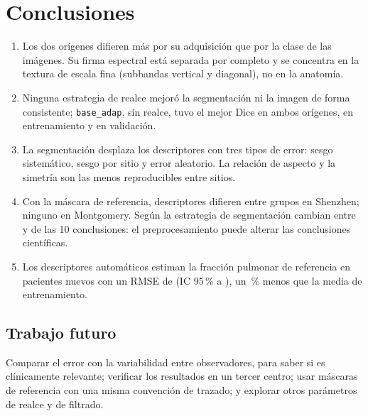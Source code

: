 ﻿\section{Conclusiones}

\begin{enumerate}
    \item Los dos orígenes difieren más por su adquisición que por la clase de las
    imágenes. Su firma espectral está separada por completo y se concentra en la
    textura de escala fina (subbandas vertical y diagonal), no en la anatomía.
    \item Ninguna estrategia de realce mejoró la segmentación ni la imagen de forma
    consistente; \texttt{base\_adap}, sin realce, tuvo el mejor Dice en ambos
    orígenes, en entrenamiento y en validación.
    \item La segmentación desplaza los descriptores con tres tipos de error: sesgo
    sistemático, sesgo por sitio y error aleatorio. La relación de aspecto y la
    simetría son las menos reproducibles entre sitios.
    \item Con la máscara de referencia, \FinOECincoSigSH{} descriptores difieren entre
    grupos en Shenzhen; ninguno en Montgomery. Según la estrategia de segmentación
    cambian entre \FinDiscMin{} y \FinDiscMax{} de las 10 conclusiones: el
    preprocesamiento puede alterar las conclusiones científicas.
    \item Los descriptores automáticos estiman la fracción pulmonar de referencia en
    pacientes nuevos con un RMSE de \FinRMSE{} (IC 95\,\% \FinRMSEInf{} a
    \FinRMSESup{}), un \FinReduccion\,\% menos que la media de entrenamiento.
\end{enumerate}

\subsection{Trabajo futuro}

Comparar el error con la variabilidad entre observadores, para saber si es
clínicamente relevante; verificar los resultados en un tercer centro; usar máscaras
de referencia con una misma convención de trazado; y explorar otros parámetros de
realce y de filtrado.

\nocite{*}

